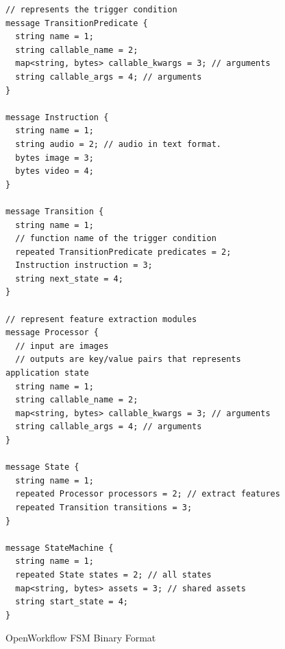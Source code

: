 \begin{figure}
\small
\begin{lstlisting}
// represents the trigger condition
message TransitionPredicate {
  string name = 1;
  string callable_name = 2; 
  map<string, bytes> callable_kwargs = 3; // arguments
  string callable_args = 4; // arguments
}

message Instruction {
  string name = 1;
  string audio = 2; // audio in text format.
  bytes image = 3;
  bytes video = 4;
}

message Transition {
  string name = 1;
  // function name of the trigger condition
  repeated TransitionPredicate predicates = 2;
  Instruction instruction = 3;
  string next_state = 4;
}

// represent feature extraction modules
message Processor {
  // input are images
  // outputs are key/value pairs that represents application state
  string name = 1;
  string callable_name = 2; 
  map<string, bytes> callable_kwargs = 3; // arguments
  string callable_args = 4; // arguments
}

message State {
  string name = 1;
  repeated Processor processors = 2; // extract features
  repeated Transition transitions = 3;
}

message StateMachine {
  string name = 1;
  repeated State states = 2; // all states
  map<string, bytes> assets = 3; // shared assets
  string start_state = 4;
}
\end{lstlisting}
\caption{OpenWorkflow FSM Binary Format}
\label{figs:fsm-binary-format}
\end{figure}


